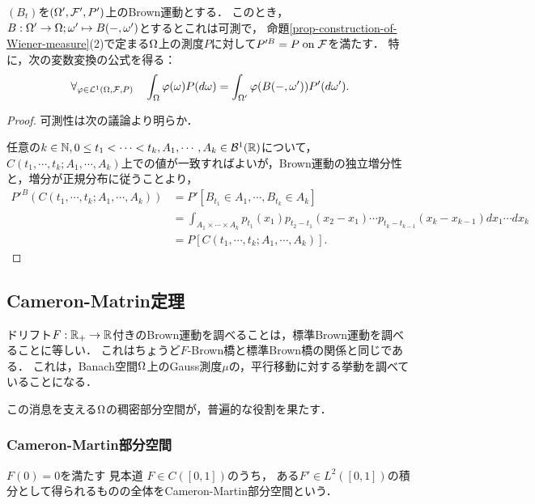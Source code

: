 \documentclass[uplatex,dvipdfmx]{jsreport}
\begin{document}
\begin{lemma}[Wiener測度の特徴付け]
    $(B_t)$を$(\Omega',\mathcal{F}',P')$上のBrown運動とする．
    このとき，$B:\Omega'\to\Omega;\omega'\mapsto B(-,\omega')$とするとこれは可測で，
    命題\ref{prop-construction-of-Wiener-measure}(2)で定まる$\Omega$上の測度$P$に対して$P'^B=P\;\mathrm{on}\;\mathcal{F}$を満たす．
    特に，次の変数変換の公式を得る：
    \[\forall_{\varphi\in\mathcal{L}^1(\Omega,\mathcal{F},P)}\quad\int_\Omega\varphi(\omega)P(d\omega)=\int_{\Omega'}\varphi(B(-,\omega'))P'(d\omega').\]
\end{lemma}
\begin{proof}
    可測性は次の議論より明らか．

    任意の$k\in\mathbb{N},0\le t_1<\cdots<t_k,A_1,\cdots,A_k\in\mathcal{B}^1(\mathbb{R})$について，$C(t_1,\cdots,t_k;A_1,\cdots,A_k)$上での値が一致すればよいが，Brown運動の独立増分性と，増分が正規分布に従うことより，
    \begin{align*}
        P'^B(C(t_1,\cdots,t_k;A_1,\cdots,A_k))&=P'[B_{t_1}\in A_1,\cdots,B_{t_k}\in A_k]\\
        &=\int_{A_1\times\cdots\times A_k}p_{t_1}(x_1)p_{t_2-t_1}(x_2-x_1)\cdots p_{t_k-t_{k-1}}(x_k-x_{k-1})dx_1\cdots dx_k\\
        &=P[C(t_1,\cdots,t_k;A_1,\cdots,A_k)].
    \end{align*}
\end{proof}

\subsection{Cameron-Matrin定理}

\begin{tcolorbox}[colframe=ForestGreen, colback=ForestGreen!10!white,breakable,colbacktitle=ForestGreen!40!white,coltitle=black,fonttitle=\bfseries\sffamily,
title=]
    ドリフト$F:\mathbb{R}_+\to\mathbb{R}$付きのBrown運動を調べることは，標準Brown運動を調べることに等しい．
    これはちょうど$F$-Brown橋と標準Brown橋の関係と同じである．
    これは，Banach空間$\Omega$上のGauss測度$\mu$の，平行移動に対する挙動を調べていることになる．

    この消息を支える$\Omega$の稠密部分空間が，普遍的な役割を果たす．
\end{tcolorbox}

\subsubsection{Cameron-Martin部分空間}

\begin{tcolorbox}[colframe=ForestGreen, colback=ForestGreen!10!white,breakable,colbacktitle=ForestGreen!40!white,coltitle=black,fonttitle=\bfseries\sffamily,
title=]
    $F(0)=0$を満たす
    見本道
    $F\in C([0,1])$のうち，
    ある$F'\in L^2([0,1])$の積分として得られるものの全体をCameron-Martin部分空間という．
\end{tcolorbox}
\end{document}
